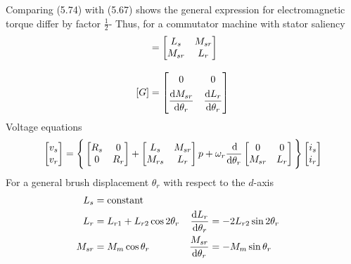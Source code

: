 \documentclass[a4paper,numbers=noenddot,12pt]{scrbook}
\begin{document}
Comparing (5.74) with (5.67) shows the general expression for electromagnetic torque differ by factor $\frac{1}{2}$-
Thus, for a commutator machine with stator saliency
\begin{align*}
    [L] & = 
    \begin{bmatrix}
        L_s & M_{sr} \\
        M_{sr} & L_r
    \end{bmatrix} \\[2ex]
    [G] & = 
    \begin{bmatrix}
        0 & 0 \\[1ex]
        \dfrac{\dif M_{sr}}{\dif \theta_r} & \dfrac{\dif L_{r}}{\dif \theta_r} 
    \end{bmatrix}
\end{align*}
Voltage equations
\begin{equation}
    \begin{bmatrix}
        v_s \\ v_r
    \end{bmatrix} = \Bigg\{
        \begin{bmatrix}
            R_s & 0 \\ 0 & R_r 
        \end{bmatrix} +
        \begin{bmatrix}
            L_s & M_{sr} \\
            M_{rs} & L_{r}
        \end{bmatrix}p \\
        + \omega_r \frac{\dif}{\dif \theta_r}
        \begin{bmatrix}
            0 & 0 \\
            M_{sr} & L_{r}
        \end{bmatrix}
    \Bigg\}
    \begin{bmatrix}
        i_s \\
        i_r
    \end{bmatrix}
\end{equation}
For a general brush displacement $\theta_r$ with respect to the $d$-axis
\begin{align*}
    L_s & = \text{constant} \\
    L_r & = L_{r1} + L_{r2} \cos 2 \theta_r & \frac{\dif L_r}{\dif \theta_r} & = - 2 L_{r2} \sin 2 \theta_r \\
    M_{sr} & = M_m \cos \theta_r &  \frac{M_{sr}}{\dif \theta_r} & = - M_m \sin \theta_r 
\end{align*}
\end{document}
